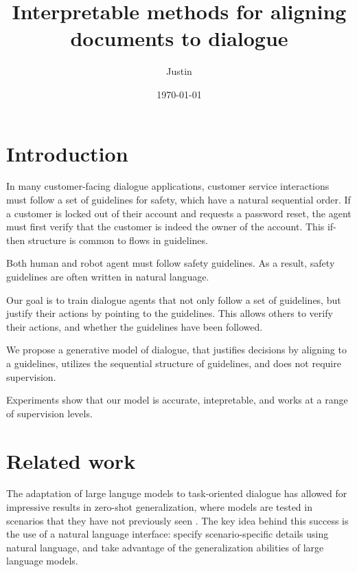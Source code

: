 \documentclass[12pt]{article}
\title{Interpretable methods for aligning documents to dialogue}
\author{Justin}
\date{\today}
\begin{document}
\maketitle

\section{Introduction}
In many customer-facing dialogue applications,
customer service interactions must follow a set of guidelines for safety,
which have a natural sequential order.
If a customer is locked out of their account and requests a password reset,
the agent must first verify that the customer is indeed the owner of the account.
This if-then structure is common to flows in guidelines.

Both human and robot agent must follow safety guidelines.
As a result, safety guidelines are often written in natural language.

Our goal is to train dialogue agents that not only follow a set of guidelines,
but justify their actions by pointing to the guidelines.
This allows others to verify their actions, and whether the guidelines have been followed.

We propose a generative model of dialogue,
that justifies decisions by aligning to a guidelines,
utilizes the sequential structure of guidelines,
and does not require supervision.

Experiments show that our model is accurate,
intepretable,
and works at a range of supervision levels.

\section{Related work}
The adaptation of large languge models to task-oriented dialogue
has allowed for impressive results in zero-shot generalization,
where models are tested in scenarios that they have not previously seen
\cite{}.
The key idea behind this success is the use of a natural language interface:
specify scenario-specific details using natural language,
and take advantage of the generalization abilities of large language models.
\end{document}
